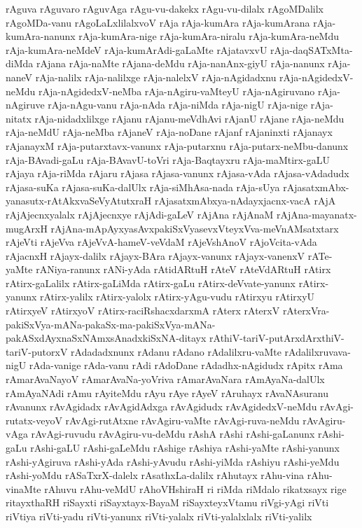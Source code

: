 {rAguva
rAguvaro
rAguvAga
rAgu-vu-dakekx
rAgu-vu-dilalx
rAgoMDalilx
rAgoMDa-vanu
rAgoLaLxlilalxvoV
rAja
rAja-kumAra
rAja-kumArana
rAja-kumAra-nanunx
rAja-kumAra-nige
rAja-kumAra-niralu
rAja-kumAra-neMdu
rAja-kumAra-neMdeV
rAja-kumArAdi-gaLaMte
rAjatavxvU
rAja-daqSATxMta-diMda
rAjana
rAja-naMte
rAjana-deMdu
rAja-nanAnx-giyU
rAja-nanunx
rAja-naneV
rAja-nalilx
rAja-nalilxge
rAja-nalelxV
rAja-nAgidadxnu
rAja-nAgidedxV-neMdu
rAja-nAgidedxV-neMba
rAja-nAgiru-vaMteyU
rAja-nAgiruvano
rAja-nAgiruve
rAja-nAgu-vanu
rAja-nAda
rAja-niMda
rAja-nigU
rAja-nige
rAja-nitatx
rAja-nidadxlilxge
rAjanu
rAjanu-meVdhAvi
rAjanU
rAjane
rAja-neMdu
rAja-neMdU
rAja-neMba
rAjaneV
rAja-noDane
rAjanf
rAjaninxti
rAjanayx
rAjanayxM
rAja-putarxtavx-vanunx
rAja-putarxnu
rAja-putarx-neMbu-danunx
rAja-BAvadi-gaLu
rAja-BAvavU-toVri
rAja-Baqtayxru
rAja-maMtirx-gaLU
rAjaya
rAja-riMda
rAjaru
rAjasa
rAjasa-vanunx
rAjasa-vAda
rAjasa-vAdadudx
rAjasa-suKa
rAjasa-suKa-dalUlx
rAja-siMhAsa-nada
rAja-sUya
rAjasatxmAbx-yanasutx-rAtAkxvaSeVyAtutxraH
rAjasatxmAbxya-nAdayxjacnx-vacA
rAjA
rAjAjecnxyalalx
rAjAjecnxye
rAjAdi-gaLeV
rAjAna
rAjAnaM
rAjAna-mayanatx-mugArxH
rAjAna-mApAyxyasAvxpakiSxVyasevxVteyxVva-meVnAMsatxtarx
rAjeVti
rAjeVva
rAjeVvA-hameV-veVdaM
rAjeVshAnoV
rAjoVcita-vAda
rAjacnxH
rAjayx-dalilx
rAjayx-BAra
rAjayx-vanunx
rAjayx-vanenxV
rATe-yaMte
rANiya-ranunx
rANi-yAda
rAtidARtuH
rAteV
rAteVdARtuH
rAtirx
rAtirx-gaLalilx
rAtirx-gaLiMda
rAtirx-gaLu
rAtirx-deVvate-yanunx
rAtirx-yanunx
rAtirx-yalilx
rAtirx-yalolx
rAtirx-yAgu-vudu
rAtirxyu
rAtirxyU
rAtirxyeV
rAtirxyoV
rAtirx-raciRshacxdarxmA
rAterx
rAterxV
rAterxVra-pakiSxVya-mANa-pakaSx-ma-pakiSxVya-mANa-pakASxdAyxnaSxNAmxsAnadxkiSxNA-ditayx
rAthiV-tariV-putArxdArxthiV-tariV-putorxV
rAdadadxnunx
rAdanu
rAdano
rAdalilxru-vaMte
rAdalilxruvava-nigU
rAda-vanige
rAda-vanu
rAdi
rAdoDane
rAdadhx-nAgidudx
rApitx
rAma
rAmarAvaNayoV
rAmarAvaNa-yoVriva
rAmarAvaNara
rAmAyaNa-dalUlx
rAmAyaNAdi
rAmu
rAyiteMdu
rAyu
rAye
rAyeV
rAruhayx
rAvaNAsuranu
rAvanunx
rAvAgidadx
rAvAgidAdxga
rAvAgidudx
rAvAgidedxV-neMdu
rAvAgi-rutatx-veyoV
rAvAgi-rutAtxne
rAvAgiru-vaMte
rAvAgi-ruva-neMdu
rAvAgiru-vAga
rAvAgi-ruvudu
rAvAgiru-vu-deMdu
rAshA
rAshi
rAshi-gaLanunx
rAshi-gaLu
rAshi-gaLU
rAshi-gaLeMdu
rAshige
rAshiya
rAshi-yaMte
rAshi-yanunx
rAshi-yAgiruva
rAshi-yAda
rAshi-yAvudu
rAshi-yiMda
rAshiyu
rAshi-yeMdu
rAshi-yoMdu
rASaTxrX-dalelx
rAsathxLa-dalilx
rAhutayx
rAhu-vina
rAhu-vinaMte
rAhuvu
rAhu-veMdU
rAhoVHshiraH
ri
riMda
riMdalo
rikatxsayx
rige
ritayxthaRH
riSayxti
riSayxtayx-BayaM
riSayxteyxVtamu
riVgi-yAgi
riVti
riVtiya
riVti-yadu
riVti-yanunx
riVti-yalalx
riVti-yalalxlalx
riVti-yalilx
}
